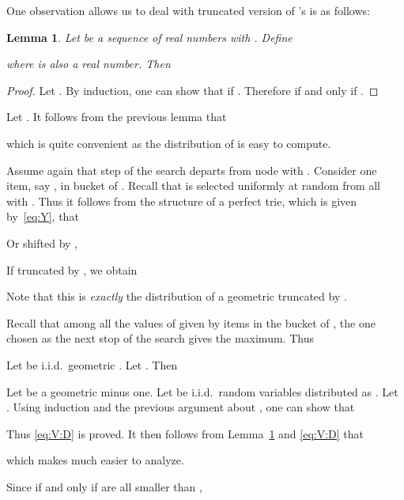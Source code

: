 \documentclass{article}
\newtheorem{lemma}{Lemma}
\begin{document}
One observation allows us to deal with truncated version of 's is as
follows:
\begin{lemma}
    Let  be a sequence of real numbers with . Define
    
    where  is also a real number.  Then
    
    \label{lem:truncation}
\end{lemma}

\begin{proof}
    Let .
    By induction,
    one can show that  if . 
    Therefore  if and only if .
\end{proof}

\noindent Let .
It follows from the previous lemma that

which is quite convenient as the distribution of  is easy to compute.

Assume again that step  of the search departs from node  with
. Consider one item, say , in bucket  of .
Recall that  is selected uniformly at random from all  with
.  Thus it follows from the structure of a perfect
trie, which is given by~\eqref{eq:Y}, that

Or shifted by ,

If truncated by , we obtain

Note that this is \emph{exactly} the distribution of a geometric  truncated by .

Recall that among all the values of  given by items in the
bucket  of , the one chosen as the next stop of the search gives the maximum.
Thus
 
Let  be i.i.d.\ geometric .  Let .
Then


Let  be a geometric  minus one. 
Let  be i.i.d.\ random variables distributed as .  Let
.  Using induction and the
previous argument about , one can show that

    
    Thus \eqref{eq:V:D} is proved.
    It then follows from Lemma~\ref{lem:truncation} and \eqref{eq:V:D} that

which makes  much easier to analyze.

Since  if and only if  are all smaller than , 
\end{document}
